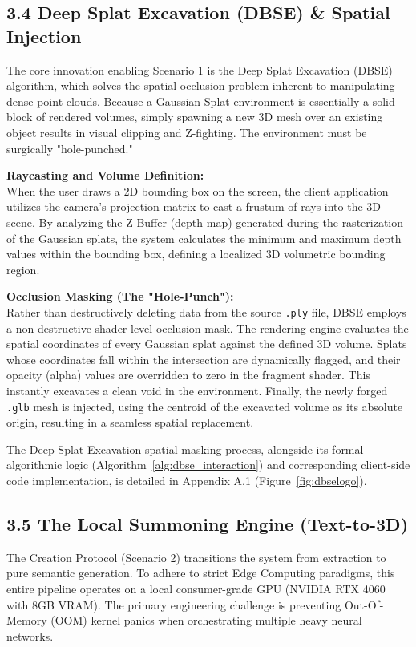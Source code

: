 \subsection*{3.4 Deep Splat Excavation (DBSE) \& Spatial Injection}
The core innovation enabling Scenario 1 is the Deep Splat Excavation (DBSE) algorithm, which solves the spatial occlusion problem inherent to manipulating dense point clouds. Because a Gaussian Splat environment is essentially a solid block of rendered volumes, simply spawning a new 3D mesh over an existing object results in visual clipping and Z-fighting. The environment must be surgically "hole-punched."

\vspace{1em}
\textbf{Raycasting and Volume Definition:} \\
When the user draws a 2D bounding box on the screen, the client application utilizes the camera's projection matrix to cast a frustum of rays into the 3D scene. By analyzing the Z-Buffer (depth map) generated during the rasterization of the Gaussian splats, the system calculates the minimum and maximum depth values within the bounding box, defining a localized 3D volumetric bounding region.

\vspace{1em}
\textbf{Occlusion Masking (The "Hole-Punch"):} \\
Rather than destructively deleting data from the source \texttt{.ply} file, DBSE employs a non-destructive shader-level occlusion mask. The rendering engine evaluates the spatial coordinates of every Gaussian splat against the defined 3D volume. Splats whose coordinates fall within the intersection are dynamically flagged, and their opacity (alpha) values are overridden to zero in the fragment shader. This instantly excavates a clean void in the environment. Finally, the newly forged \texttt{.glb} mesh is injected, using the centroid of the excavated volume as its absolute origin, resulting in a seamless spatial replacement. 

The Deep Splat Excavation spatial masking process, alongside its formal algorithmic logic (Algorithm~\ref{alg:dbse_interaction}) and corresponding client-side code implementation, is detailed in Appendix A.1 (Figure~\ref{fig:dbselogo}).

\vspace{1em}
\subsection*{3.5 The Local Summoning Engine (Text-to-3D)}
The Creation Protocol (Scenario 2) transitions the system from extraction to pure semantic generation. To adhere to strict Edge Computing paradigms, this entire pipeline operates on a local consumer-grade GPU (NVIDIA RTX 4060 with 8GB VRAM). The primary engineering challenge is preventing Out-Of-Memory (OOM) kernel panics when orchestrating multiple heavy neural networks.

